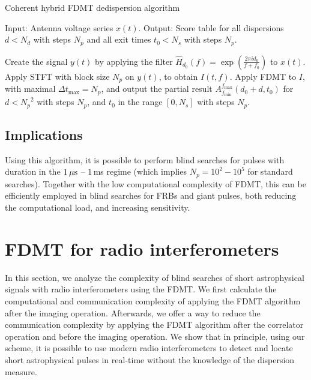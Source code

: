 \documentclass[iop]{emulateapj}
\begin{document}
\begin{algorithm}[H]
\caption{Coherent hybrid FDMT dedispersion algorithm}
\label{alg:AlgorithmCoherent}
Input: Antenna voltage series $x(t)$.\newline
Output: Score table for all dispersions $d<{N_{d}}$ with steps ${N_{p}}$ and all exit times $t_0<{N_{s}}$ with steps ${N_{p}}$. 

\begin{algorithmic}[1]
  

\STATE Create the signal $y(t)$ by applying the filter $\hat{H}_{d_0}(f) = \exp{\left(\frac{2\pi i d_0}{f+f_0}\right)}$ to $x(t)$.
\STATE Apply STFT with block size ${N_{p}}$ on $y(t)$, to obtain $I(t,f)$.
\STATE Apply FDMT to $I$, with maximal $\Delta t_{\max}={N_{p}}$, and output the partial result $A_{f_{\min}}^{f_{\max}}(d_0 + d,t_0)$ for $d<{N_{p}}^2$ with steps ${N_{p}}$, and  $t_0$ in the range $[0,{N_{s}}]$ with steps ${N_{p}}$.
\ENDFOR
\end{algorithmic}
\end{algorithm}



\subsection{Implications}
Using this algorithm, it is possible to perform blind searches for pulses with duration in the $1\,{\rm \mu s}$ -- $1\,$ms regime (which implies ${N_{p}} = 10^2 - 10^5$ for standard searches).
Together with the low computational complexity of FDMT, this can be efficiently employed in blind searches for FRBs and giant pulses, both reducing the computational load, and increasing sensitivity.

\section{FDMT for radio interferometers} \label{sec:DedispersionInterferometers}
In this section, we analyze the complexity of blind searches of short astrophysical signals with radio interferometers using the FDMT. We first calculate the computational and communication complexity of applying the FDMT algorithm after the imaging operation. Afterwards, we offer a way to reduce the communication complexity by applying the FDMT algorithm after the correlator operation and before the imaging operation.
We show that in principle, using our scheme, it is possible to use modern radio interferometers to detect and locate short astrophysical pulses in real-time without the knowledge of the dispersion measure.
\end{document}
